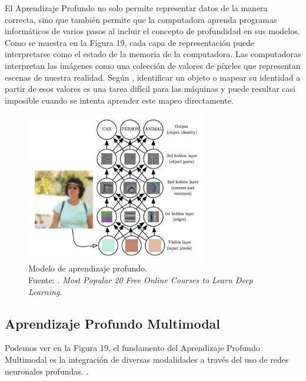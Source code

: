 El Aprendizaje Profundo no solo permite representar datos de la manera correcta, sino que también permite que la computadora aprenda programas informáticos de varios pasos al incluir el concepto de profundidad en sus modelos. Como se muestra en la Figura 19, cada capa de representación puede interpretarse como el estado de la memoria de la computadora. Las computadoras interpretan las imágenes como una colección de valores de píxeles que representan escenas de nuestra realidad. Según \parencite{tec_cook2018deeplearning}, identificar un objeto o mapear su identidad a partir de esos valores es una tarea difícil para las máquinas y puede resultar casi imposible cuando se intenta aprender este mapeo directamente.

\begin{figure}[!ht]
	\begin{center}
		\includegraphics[width=0.70\textwidth]{2/figures/deeplearning_machinelearning2.jpg}
		\caption[Modelo de aprendizaje profundo]{Modelo de aprendizaje profundo.\\
		Fuente: \cite{tec_cook2018deeplearning}. \textit{Most Popular 20 Free Online Courses to Learn Deep Learning}.}
		\label{2:fig6}
	\end{center}
\end{figure}


\subsection{Aprendizaje Profundo Multimodal}
Podemos ver en la Figura 19, el fundamento del Aprendizaje Profundo Multimodal es la integración de diversas modalidades a través del uso de redes neuronales profundas. \parencite{bk_deng2018deeplearningnlp}.

